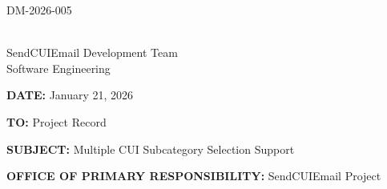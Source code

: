 \documentclass[11pt,letterpaper]{article}
\newcommand{\UniqueID}{DM-2026-005}
\newcommand{\DocumentDate}{January 21, 2026}
\newcommand{\AuthorName}{SendCUIEmail Development Team}
\newcommand{\AuthorTitle}{Software Engineering}
\newcommand{\ToField}{Project Record}
\newcommand{\SubjectField}{Multiple CUI Subcategory Selection Support}
\newcommand{\OPRField}{SendCUIEmail Project}
\begin{document}
\hfill \UniqueID

\vspace{0.25in}

\underline{\hspace{2.5in}}\\[2pt]
\AuthorName\\
\AuthorTitle

\vspace{0.25in}

\textbf{DATE:} \DocumentDate

\textbf{TO:} \ToField

\textbf{SUBJECT:} \SubjectField

\textbf{OFFICE OF PRIMARY RESPONSIBILITY:} \OPRField

\vspace{0.25in}
\end{document}
